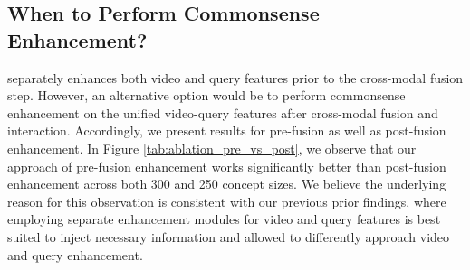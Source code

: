 
\subsection{When to Perform Commonsense Enhancement?}
\label{ablation:prevpost}
\modelname separately enhances both video and query features prior to the cross-modal fusion step. However, an  alternative option would be to perform commonsense enhancement on the unified video-query features after cross-modal fusion and interaction. Accordingly, we present results for pre-fusion as well as post-fusion enhancement. 
In Figure \ref{tab:ablation_pre_vs_post}, we observe that our approach of pre-fusion enhancement works significantly better than post-fusion enhancement across both 300 and 250 concept sizes. We believe the underlying reason for this observation is consistent with our previous prior findings, where employing separate enhancement modules for video and query features is best suited to inject necessary information and allowed \modelname to differently approach video and query enhancement.
